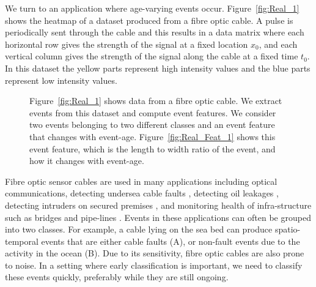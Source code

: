 \documentclass[a4paper,11pt]{article}
\begin{document}
We turn to an application where age-varying events occur. Figure~\ref{fig:Real_1} shows the heatmap of a dataset produced from a fibre optic cable. A pulse is periodically sent through the cable and this results in a data matrix where each horizontal row gives the strength of the signal at a fixed location $x_0$, and each vertical column gives the strength of the signal along the cable at a fixed time $t_0$. In this dataset the yellow parts represent high intensity values and the blue parts represent low intensity values.

\begin{figure}

	\caption{Figure~\ref{fig:Real_1} shows data from a fibre optic cable. We extract events from this dataset and compute event features. We consider two events belonging to two different classes and an event feature that changes with event-age. Figure~\ref{fig:Real_Feat_1} shows this event feature, which is the length to width ratio of the event, and how it changes with event-age.}
  \label{fig:Real_World_Data}
\end{figure}

Fibre optic sensor cables are used in many applications including optical communications, detecting undersea cable faults \citep{jiang2009technological}, detecting oil leakages \citep{nikles2004leakage}, detecting intruders on secured premises \citep{griffiths1995developments}, and monitoring health of infra-structure such as bridges and pipe-lines \citep{li2004recent}. Events in these applications can often be grouped into two classes. For example, a cable lying on the sea bed can produce spatio-temporal events that are either cable faults (A), or non-fault events due to the activity in the ocean (B)\@. Due to its sensitivity, fibre optic cables are also prone to noise. In a setting where early classification is important, we need to classify these events quickly, preferably while they are still ongoing.
\end{document}
